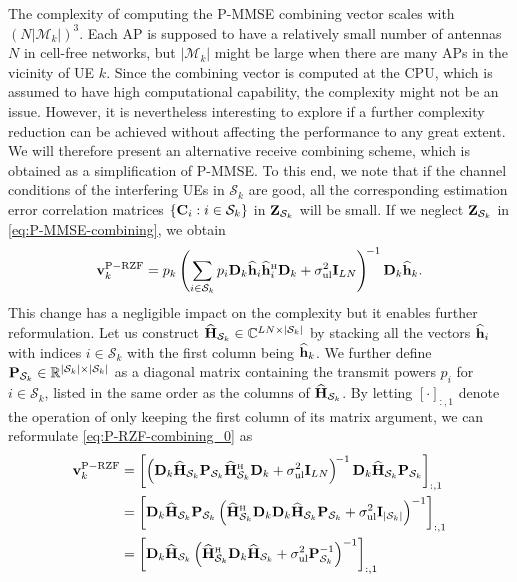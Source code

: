 The complexity of computing the P-MMSE combining vector scales with $(N|\mathcal{M}_k|)^3$. Each AP is supposed to have a relatively small number of antennas $N$ in cell-free networks, but $|\mathcal{M}_k|$ might be large when there are many APs in the vicinity of UE $k$. Since the combining vector is computed at the CPU, which  is assumed to have high computational capability, the complexity might not be an issue. However, it is nevertheless interesting to explore if a further complexity reduction can be achieved without affecting the performance to any great extent.
We will therefore present an alternative receive combining scheme, which is obtained as a simplification of P-MMSE. To this end, we note that if the channel conditions of the interfering UEs in $\mathcal{S}_k$ are good, all the corresponding estimation error correlation matrices $\{{\bf C}_i : i \in {\mathcal S}_k\}$ in $\mathbf{Z}_{{\mathcal S}_k}$ will be small. If we neglect $\mathbf{Z}_{{\mathcal S}_k}$ in \eqref{eq:P-MMSE-combining}, we obtain
\begin{equation} \label{eq:P-RZF-combining_0}
\vect{v}_k^{{\rm P-RZF}} =   
p_k\left(\sum\limits_{i \in \mathcal {S}_k} p_{i}  \vect{D}_{k}\widehat{\vect{h}}_{i} \widehat{\vect{h}}_{i}^{\Htran}\vect{D}_{k} + \sigma^2_{\rm ul}\vect{I}_{LN} \right)^{\! -1} \vect{{D}}_{k}\widehat{{\bf h}}_k.
\end{equation}
This change has a negligible impact on the complexity but it enables further reformulation.
Let us construct $\mathbf{\widehat{H}}_{\mathcal{S}_k} \in \mathbb{C}^{LN\times |\mathcal{S}_k|}$ by stacking all the vectors $\mathbf{\widehat{h}}_i$ with indices $i\in \mathcal{S}_k$ with the first column being $\mathbf{\widehat{h}}_k$.
We further define $\mathbf{{P}}_{\mathcal{S}_k} \in \mathbb{R}^{|\mathcal{S}_k| \times |\mathcal{S}_k|}$ as a diagonal matrix containing the transmit powers $p_i$ for $i\in \mathcal{S}_k$, listed in the same order as the columns of $\mathbf{\widehat{H}}_{\mathcal{S}_k}$.
By letting $[\cdot]_{:,1}$ denote the operation of only keeping the first column of its matrix argument,
we can reformulate \eqref{eq:P-RZF-combining_0} as 
\begin{align} \nonumber
\vect{v}_{k}^{{\rm P-RZF}} &= \left [ \left( \vect{D}_{k} \vect{\widehat{H}}_{\mathcal{S}_k}  \vect{{P}}_{\mathcal{S}_k} \vect{\widehat{H}}_{\mathcal{S}_k}^{\Htran}\vect{D}_{k} + \sigma^2_{\rm ul}\vect{I}_{LN} \right)^{\!-1} \vect{{D}}_{k}\vect{\widehat{H}}_{\mathcal{S}_k} \vect{{P}}_{\mathcal{S}_k} \right]_{:,1} \\ \nonumber
&=  \left [\vect{{D}}_{k}\vect{\widehat{H}}_{\mathcal{S}_k} \vect{{P}}_{\mathcal{S}_k} \left( \vect{\widehat{H}}^{\Htran}_{\mathcal{S}_k}\vect{{D}}_{k}\vect{{D}}_{k}\vect{\widehat{H}}_{\mathcal{S}_k} \vect{{P}}_{\mathcal{S}_k} +\sigmaUL\vect{{I}}_{|\mathcal{S}_k|} \right)^{-1} \right]_{:,1}  \\
&=  \left [\vect{{D}}_{k}\vect{\widehat{H}}_{\mathcal{S}_k}\left( \vect{\widehat{H}}^{\Htran}_{\mathcal{S}_k}\vect{{D}}_{k}\vect{\widehat{H}}_{\mathcal{S}_k}+\sigmaUL\vect{{P}}_{\mathcal{S}_k}^{-1} \right)^{-1} \right]_{:,1}  \label{eq:P-RZF-combining_1}
\end{align}
